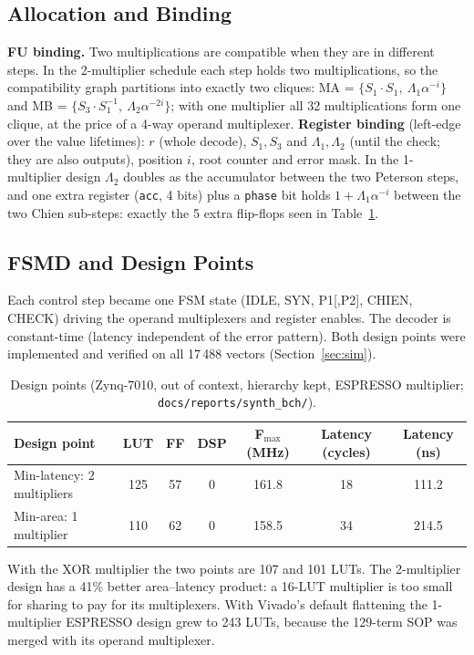 \documentclass[11pt,a4paper]{article}
\begin{document}
\subsection{Allocation and Binding}
\textbf{FU binding.} Two multiplications are compatible when they are in different steps. In the
2-multiplier schedule each step holds two multiplications, so the compatibility graph partitions into
exactly two cliques: MA = $\{S_1\!\cdot\!S_1,\ \Lambda_1\alpha^{-i}\}$ and MB = $\{S_3\!\cdot\!S_1^{-1},\
\Lambda_2\alpha^{-2i}\}$; with one multiplier all 32 multiplications form one clique, at the price of a
4-way operand multiplexer. \textbf{Register binding} (left-edge over the value lifetimes): $r$ (whole
decode), $S_1,S_3$ and $\Lambda_1,\Lambda_2$ (until the check; they are also outputs), position $i$,
root counter and error mask. In the 1-multiplier design $\Lambda_2$ doubles as the accumulator between
the two Peterson steps, and one extra register (\texttt{acc}, 4 bits) plus a \texttt{phase} bit holds
$1+\Lambda_1\alpha^{-i}$ between the two Chien sub-steps: exactly the 5 extra flip-flops seen in
Table~\ref{tab:designpoints}.

\subsection{FSMD and Design Points}
Each control step became one FSM state (IDLE, SYN, P1[,P2], CHIEN, CHECK) driving the operand
multiplexers and register enables. The decoder is constant-time (latency independent of the error
pattern). Both design points were implemented and verified on all 17\,488 vectors (Section~\ref{sec:sim}).

\begin{table}[H]\centering\small
\caption{Design points (Zynq-7010, out of context, hierarchy kept, ESPRESSO multiplier; \texttt{docs/reports/synth\_bch/}).}\label{tab:designpoints}
\begin{tabular}{@{}lcccccc@{}}
\toprule
Design point & LUT & FF & DSP & F$_\text{max}$ (MHz) & Latency (cycles) & Latency (ns)\\
\midrule
Min-latency: 2 multipliers & 125 & 57 & 0 & 161.8 & 18 & 111.2\\
Min-area: 1 multiplier     & 110 & 62 & 0 & 158.5 & 34 & 214.5\\
\bottomrule
\end{tabular}
\end{table}
With the XOR multiplier the two points are 107 and 101 LUTs. The 2-multiplier design has a 41\% better
area--latency product: a 16-LUT multiplier is too small for sharing to pay for its multiplexers. With
Vivado's default flattening the 1-multiplier ESPRESSO design grew to 243 LUTs, because the 129-term SOP
was merged with its operand multiplexer.
\end{document}
